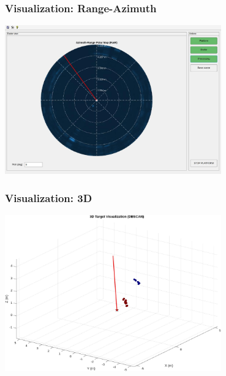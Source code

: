 \documentclass[aspectratio=169]{beamer}
\begin{document}
\begin{frame}[fragile]
  \frametitle{Visualization: Range-Azimuth}
  \begin{center}
    \includegraphics[width=0.7\textwidth]{../img/vis_range_azimuth.jpg}
  \end{center}
\end{frame}

\begin{frame}[fragile]
  \frametitle{Visualization: 3D}
  \begin{center}
    \includegraphics[width=0.7\textwidth]{../img/vis_3d.jpg}
  \end{center}
\end{frame}
\end{document}
